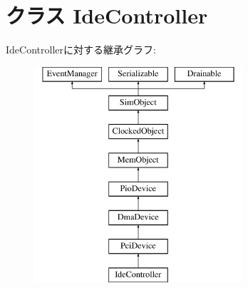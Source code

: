 \hypertarget{classIde_1_1IdeController}{
\section{クラス IdeController}
\label{classIde_1_1IdeController}
}
IdeControllerに対する継承グラフ:\begin{figure}[H]
\begin{center}
\leavevmode
\includegraphics[height=8cm]{classIde_1_1IdeController}
\end{center}
\end{figure}

